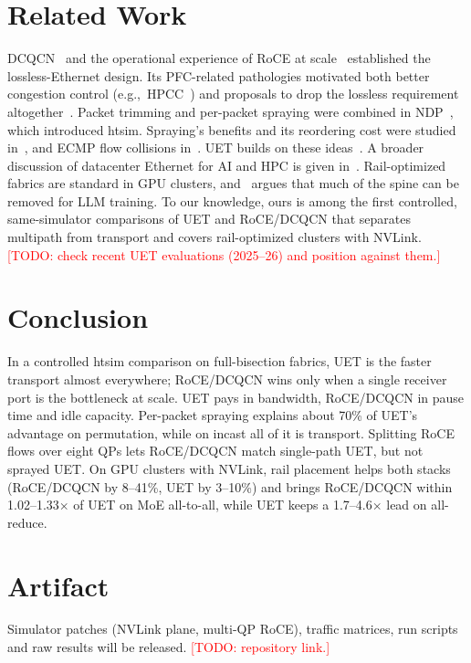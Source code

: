\documentclass[conference]{IEEEtran}
\newcommand{\todo}[1]{\textcolor{red}{[TODO: #1]}}
\begin{document}
\section{Related Work}

DCQCN~\cite{dcqcn} and the operational experience of RoCE at
scale~\cite{rdma-scale} established the lossless-Ethernet design. Its
PFC-related pathologies motivated both better congestion control
(e.g.,~HPCC~\cite{hpcc}) and proposals to drop the lossless requirement
altogether~\cite{irn}. Packet trimming and per-packet spraying were combined in
NDP~\cite{ndp}, which introduced htsim. Spraying's benefits and its reordering
cost were studied in~\cite{spray}, and ECMP flow collisions in~\cite{hedera}.
UET builds on these ideas~\cite{uec-spec,uec-design,reps}. A broader
discussion of datacenter Ethernet for AI and HPC is given
in~\cite{hoefler-ethernet}. Rail-optimized fabrics are standard in GPU
clusters, and~\cite{railonly} argues that much of the spine can be removed for
LLM training. To our knowledge, ours is among the first controlled,
same-simulator comparisons of UET and RoCE/DCQCN that separates multipath from
transport and covers rail-optimized clusters with NVLink.
\todo{check recent UET evaluations (2025--26) and position against them.}

\section{Conclusion}

In a controlled htsim comparison on full-bisection fabrics, UET is the faster
transport almost everywhere; RoCE/DCQCN wins only when a single receiver port
is the bottleneck at scale. UET pays in bandwidth, RoCE/DCQCN in pause time and
idle capacity. Per-packet spraying explains about 70\% of UET's advantage on
permutation, while on incast all of it is transport. Splitting RoCE flows over eight QPs lets
RoCE/DCQCN match single-path UET, but not sprayed UET. On GPU clusters with
NVLink, rail placement helps both stacks (RoCE/DCQCN by 8--41\%, UET by
3--10\%) and brings RoCE/DCQCN within 1.02--1.33$\times$ of UET on MoE
all-to-all, while UET keeps a 1.7--4.6$\times$ lead on all-reduce.

\section*{Artifact}
Simulator patches (NVLink plane, multi-QP RoCE), traffic matrices, run scripts
and raw results will be released. \todo{repository link.}

\FloatBarrier
\balance


\end{document}
